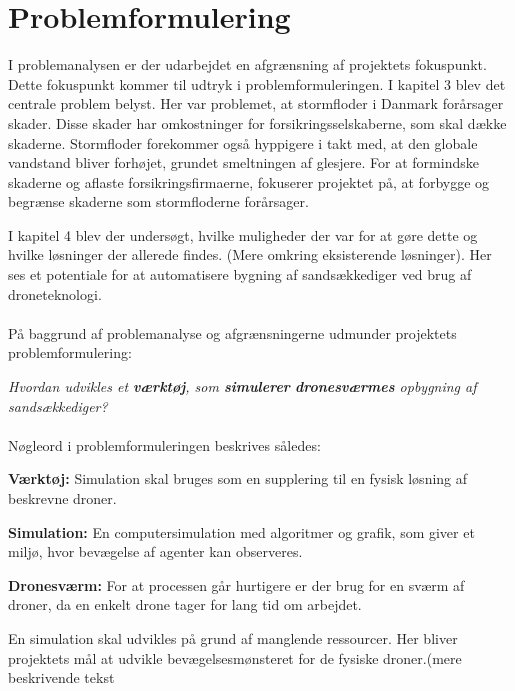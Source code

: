 \chapter{Problemformulering}\label{ch:problemformulering}
I problemanalysen er der udarbejdet en afgrænsning af projektets fokuspunkt. Dette fokuspunkt kommer til udtryk i problemformuleringen. I kapitel 3 blev det centrale problem belyst. Her var problemet, at stormfloder i Danmark forårsager skader. Disse skader har omkostninger for forsikringsselskaberne, som skal dække skaderne. Stormfloder forekommer også hyppigere i takt med, at den globale vandstand bliver forhøjet, grundet smeltningen af glesjere. For at formindske skaderne og aflaste forsikringsfirmaerne, fokuserer projektet på, at forbygge og begrænse skaderne som stormfloderne forårsager. 
\par
I kapitel 4 blev der undersøgt, hvilke muligheder der var for at gøre dette og hvilke løsninger der allerede findes. (Mere omkring eksisterende løsninger). Her ses et potentiale for at automatisere bygning af sandsækkediger ved brug af droneteknologi.
\\\\
På baggrund af problemanalyse og afgrænsningerne udmunder projektets problemformulering:

\textit{Hvordan udvikles et \textbf{værktøj}, som \textbf{simulerer} \textbf{dronesværmes} opbygning af sandsækkediger?}
\\\\
Nøgleord i problemformuleringen beskrives således:

\textbf{Værktøj:}
Simulation skal bruges som en supplering til en fysisk løsning af beskrevne droner.

\textbf{Simulation:}
En computersimulation med algoritmer og grafik, som giver et miljø, hvor bevægelse af agenter kan observeres.

\textbf{Dronesværm:}
For at processen går hurtigere er der brug for en sværm af droner, da en enkelt drone tager for lang tid om arbejdet.

En simulation skal udvikles på grund af manglende ressourcer. Her bliver projektets mål at udvikle bevægelsesmønsteret for de fysiske droner.(mere beskrivende tekst







